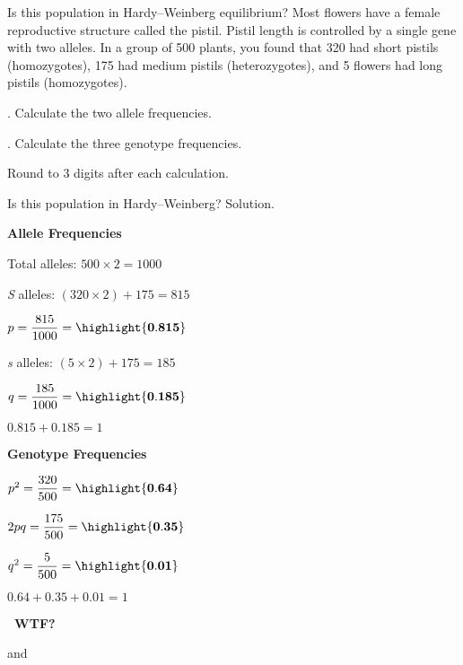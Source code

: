 \documentclass[t]{beamer}
\begin{document}
\begin{frame}{Is this population in Hardy--Weinberg equilibrium?}
	\vspace{-1\baselineskip}
	\hangpara Most flowers have a female reproductive structure called the pistil. Pistil length is controlled by a single gene with two alleles. In a group of 500 plants, you found that 320 had short pistils (homozygotes), 175 had medium pistils (heterozygotes), and 5 flowers had long pistils (homozygotes). 

	. Calculate the two allele frequencies.

	. Calculate the three genotype frequencies.

	\hangpara Round to 3 digits after each calculation.
\end{frame}
%
{
\begin{frame}{Is this population in Hardy--Weinberg? Solution.}
\vspace{-1\baselineskip}
\begin{multicols}{2}

	\hangpara \textbf{Allele Frequencies}
	
	\hangpara Total alleles: $500 \times 2 = 1000$
	
	\hangpara \emph{S} alleles: $(320 \times 2) + 175 = 815$
	
	\hangpara $p = \dfrac{815}{1000} = \highlight{\mathbf{0.815}}$

	\hangpara \emph{s} alleles: $(5 \times 2) + 175 = 185$ 

	\hangpara $q = \dfrac{185}{1000} = \highlight{\mathbf{0.185}}$
	
	\hangpara $0.815 + 0.185 = 1$ \checkmark

\columnbreak

	\hangpara \textbf{Genotype Frequencies}
	
	\hangpara $p^2 = \dfrac{320}{500} = \highlight{\mathbf{0.64}}$ 

	\hangpara $2pq = \dfrac{175}{500} = \highlight{\mathbf{0.35}}$

	\hangpara $q^2 = \dfrac{5}{500} = \highlight{\mathbf{0.01}}$

	\hangpara $0.64 + 0.35 + 0.01 = 1$ \checkmark
	
	\hangpara {}
	\textbf{\ WTF?}\vspace{-0.5\baselineskip}
	
	\hangpara {} and
	

\end{multicols}
\end{frame}
}
\end{document}
